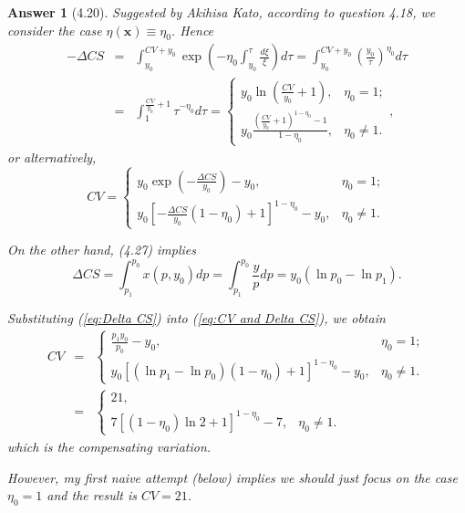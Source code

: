 \documentclass{article}
\newtheorem*{ans}{Answer}
\newcommand{\1}{{\bf 1}}
\newcommand{\0}{{\mathbf{0}}}
\newcommand{\x}{{\mathbf{x}}}
\newcommand{\<}{\langle}
\renewcommand{\>}{\rangle}
\begin{document}
\begin{ans}[4.20]
	Suggested by Akihisa Kato, according to question 4.18, we consider the case $\eta (\x) \equiv \eta_0$. Hence
\begin{eqnarray*}
	- \Delta CS &= &\int_{y_0}^{CV+y_0} \exp\left( -\eta_0 \int^{\tau}_{y_0} \frac{d \xi} { \xi}\right)d\tau =  \int_{y_0}^{CV+y_0} \left(  \frac{y_0}{\tau}  \right)^{\eta_0}d\tau \\
	&= &   \int_{1}^{\frac{CV}{y_0}+1}{\tau}^{ - \eta_0}d\tau  = \left\{\begin{array}{cc}
 y_0 \ln \left( \frac{CV}{y_0}+1  \right), & \eta_0 = 1; \\ y_0 \frac{ \left( \frac{CV}{y_0}+1\right)^{1 - \eta_0} - 1 }{1-\eta_0},& \eta_0 \ne 1.
	\end{array}\right.,
\end{eqnarray*}
or alternatively,
\begin{equation}
CV = \left\{\begin{array}{cc}
y_0\exp\left(  - \frac{\Delta CS}{y_0} \right) - y_0, & \eta_0 = 1; \\ y_0 
\left[ -\frac{\Delta CS}{y_0} (1-\eta_0) + 1 \right]^{1 - \eta_0} - y_0,& \eta_0 \ne 1.
\end{array}\right. 
\label{eq:CV and Delta CS}
\end{equation}

On the other hand, (4.27) implies 
\begin{equation}
\Delta CS = \int_{p_1}^{p_0}x(p,y_0)dp =  \int_{p_1}^{p_0}\frac{y}{p}dp = y_0 (\ln p_0 - \ln p_1).
\label{eq:Delta CS}
\end{equation}

Substituting (\ref{eq:Delta CS}) into (\ref{eq:CV and Delta CS}), we obtain
\begin{eqnarray*}
CV & = & \left\{\begin{array}{cc}
\frac{p_1y_0}{p_0}   - y_0, & \eta_0 = 1; \\ y_0 
\left[ (\ln p_1 - \ln p_0) (1-\eta_0) + 1 \right]^{1 - \eta_0} - y_0,& \eta_0 \ne 1.
\end{array}\right. \\
& = &  \left\{\begin{array}{cc}
21, \\ 7
\left[ (1-\eta_0) \ln 2 + 1 \right]^{1 - \eta_0} -7 ,& \eta_0 \ne 1.
\end{array}\right.
\end{eqnarray*}
which is the compensating variation.

However, my first naive attempt (below) implies we should just focus on the case $\eta_0 = 1$ and the result is $CV = 21$.
\end{ans}
\end{document}
